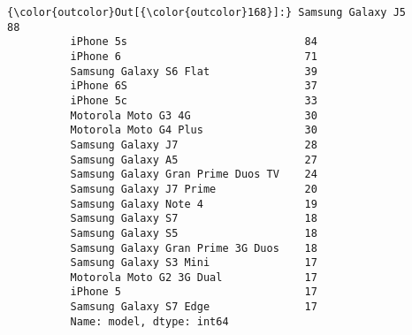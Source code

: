 \documentclass[11pt]{article}
\begin{document}
\begin{Verbatim}[commandchars=\\\{\}]
{\color{outcolor}Out[{\color{outcolor}168}]:} Samsung Galaxy J5                    88
          iPhone 5s                            84
          iPhone 6                             71
          Samsung Galaxy S6 Flat               39
          iPhone 6S                            37
          iPhone 5c                            33
          Motorola Moto G3 4G                  30
          Motorola Moto G4 Plus                30
          Samsung Galaxy J7                    28
          Samsung Galaxy A5                    27
          Samsung Galaxy Gran Prime Duos TV    24
          Samsung Galaxy J7 Prime              20
          Samsung Galaxy Note 4                19
          Samsung Galaxy S7                    18
          Samsung Galaxy S5                    18
          Samsung Galaxy Gran Prime 3G Duos    18
          Samsung Galaxy S3 Mini               17
          Motorola Moto G2 3G Dual             17
          iPhone 5                             17
          Samsung Galaxy S7 Edge               17
          Name: model, dtype: int64
\end{Verbatim}
            
\end{document}
